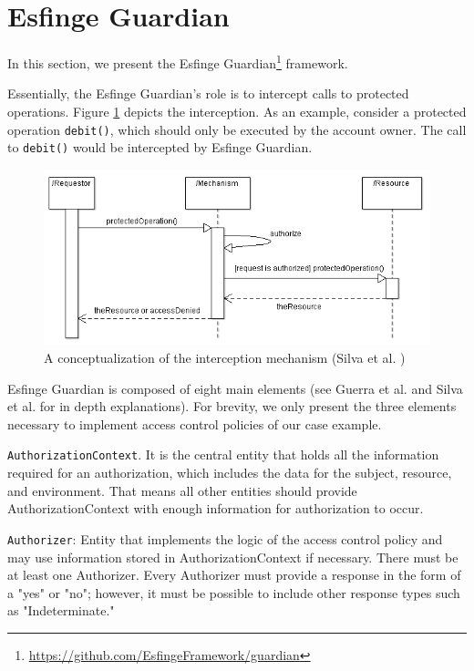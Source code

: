 \documentclass[sigconf]{acmart}
\begin{document}
\section{Esfinge Guardian}

In this section, we present the Esfinge Guardian\footnote{\url{https://github.com/EsfingeFramework/guardian}} framework.

Essentially, the Esfinge Guardian's role is to intercept calls to protected operations. Figure \ref{fig:interception-mechanism} depicts the interception. As an example, consider a protected operation \verb|debit()|, which should only be executed by the account owner. The call to \verb|debit()| would be intercepted by Esfinge Guardian.

\begin{figure}
  \centering
  \includegraphics[scale=0.5]{img/interception-mechanism.png}
  \caption{A conceptualization of the interception mechanism (Silva et al. \cite{Silva2013})}
  \label{fig:interception-mechanism}
\end{figure}

Esfinge Guardian is composed of eight main elements (see Guerra et al. \cite{Guerra2015} and Silva et al.\cite{Silva2013} for in depth explanations). For brevity, we only present the three elements necessary to implement access control policies of our case example.

\noindent \verb|AuthorizationContext|. It is the central entity that holds all the information required for an authorization, which includes the data for the subject, resource, and environment. That means all other entities should provide AuthorizationContext with enough information for authorization to occur.

\noindent \verb|Authorizer|: Entity that implements the logic of the access control policy and may use information stored in AuthorizationContext if necessary. There must be at least one Authorizer. Every Authorizer must provide a response in the form of a "yes" or "no"; however, it must be possible to include other response types such as "Indeterminate."
\end{document}
